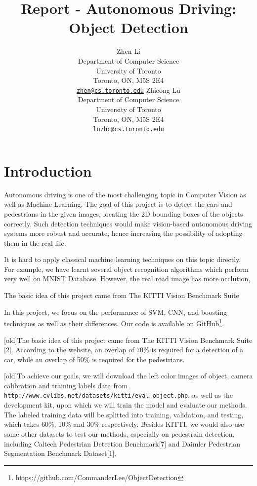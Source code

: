 \documentclass{article} %
\title{Report - Autonomous Driving: Object Detection}
\author{
Zhen Li \\
Department of Computer Science\\
University of Toronto\\
Toronto, ON, M5S 2E4 \\
\href{mailto:zhen@cs.toronto.edu}{\texttt{zhen@cs.toronto.edu}}
\And
Zhicong Lu \\
Department of Computer Science\\
University of Toronto\\
Toronto, ON, M5S 2E4 \\
\href{mailto:luzhc@cs.toronto.edu}{\texttt{luzhc@cs.toronto.edu}}
}
\begin{document}
\maketitle

\section{Introduction}

Autonomous driving is one of the most challenging topic in Computer Vision as well as Machine Learning. The goal of this project is to detect the cars and pedestrians in the given images, locating the 2D bounding boxes of the objects correctly. Such detection techniques would make vision-based autonomous driving systems more robust and accurate, hence increasing the possibility of adopting them in the real life. 

It is hard to apply classical machine learning techniques on this topic directly. For example, we have learnt several object recognition algorithms which perform very well on MNIST \cite{lecun1998gradient} Database. However, the real road image has more occlution,  

The basic idea of this project came from The KITTI Vision Benchmark Suite \cite{Geiger2012CVPR} 

In this project, we focus on the performance of SVM, CNN, and boosting techniques as well as their differences. Our code is available on GitHub\footnote{https://github.com/CommanderLee/ObjectDetection}.

[old]The basic idea of this project came from The KITTI Vision Benchmark Suite [2]. According to the website, an overlap of 70\% is required for a detection of a car, while an overlap of 50\% is required for the pedestrians.

[old]To achieve our goals, we will download the left color images of object, camera calibration and training
labels data from \texttt{http://www.cvlibs.net/datasets/kitti/eval\_object.php}, as well as the development kit, upon which we will train the model and evaluate our methods. The labeled training data will be splitted into training, validation, and testing, which takes 60\%, 10\% and 30\% respectively. Besides KITTI, we would also use some other datasets to test our methods, especially on pedestrain detection, including Caltech Pedestrian Detection Benchmark[7] and Daimler Pedestrian Segmentation Benchmark Dataset[1].
\end{document}
